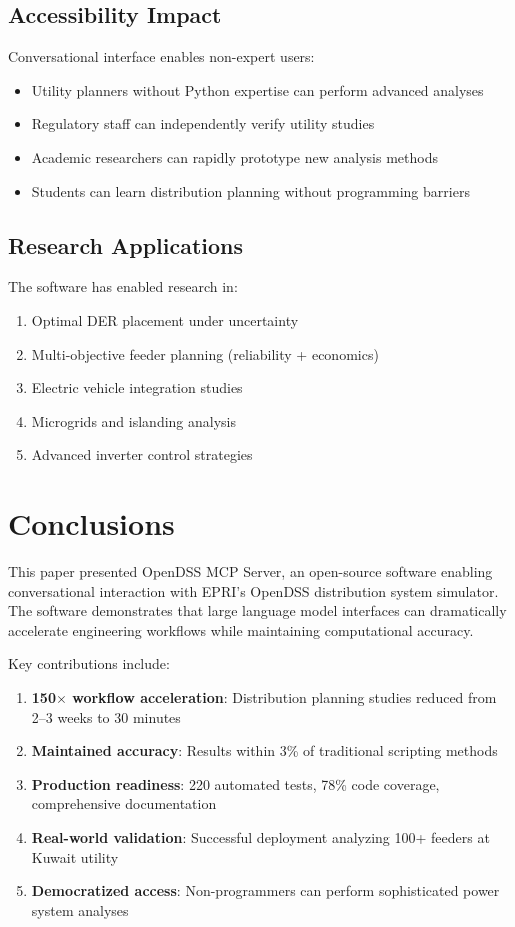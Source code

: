 \documentclass[review]{elsarticle}
\begin{document}
\subsection{Accessibility Impact}

Conversational interface enables non-expert users:
\begin{itemize}
    \item Utility planners without Python expertise can perform advanced analyses
    \item Regulatory staff can independently verify utility studies
    \item Academic researchers can rapidly prototype new analysis methods
    \item Students can learn distribution planning without programming barriers
\end{itemize}

\subsection{Research Applications}

The software has enabled research in:
\begin{enumerate}
    \item Optimal DER placement under uncertainty
    \item Multi-objective feeder planning (reliability + economics)
    \item Electric vehicle integration studies
    \item Microgrids and islanding analysis
    \item Advanced inverter control strategies
\end{enumerate}

\section{Conclusions}
\label{sec:conclusions}

This paper presented OpenDSS MCP Server, an open-source software enabling conversational interaction with EPRI's OpenDSS distribution system simulator. The software demonstrates that large language model interfaces can dramatically accelerate engineering workflows while maintaining computational accuracy.

Key contributions include:

\begin{enumerate}
    \item \textbf{150$\times$ workflow acceleration}: Distribution planning studies reduced from 2--3 weeks to 30 minutes
    \item \textbf{Maintained accuracy}: Results within 3\% of traditional scripting methods
    \item \textbf{Production readiness}: 220 automated tests, 78\% code coverage, comprehensive documentation
    \item \textbf{Real-world validation}: Successful deployment analyzing 100+ feeders at Kuwait utility
    \item \textbf{Democratized access}: Non-programmers can perform sophisticated power system analyses
\end{enumerate}
\end{document}
